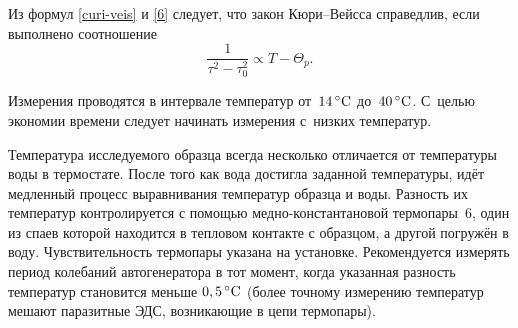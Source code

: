 Из формул \eqref{curi-veis} и \eqref{6} следует, что закон Кюри--Вейсса
справедлив, если выполнено соотношение
\begin{equation}
\frac{1}{\tau^2-\tau_0^2} \propto T-\Theta_p.
\end{equation}

Измерения проводятся в интервале температур от~$14\,^\circ\mathrm{C}$ до~$40\,^\circ\mathrm{C}$.
С~целью экономии времени следует начинать измерения с~низких температур.



Температура исследуемого образца всегда несколько отличается от температуры
воды в термостате. После того как вода достигла заданной
температуры, идёт медленный процесс выравнивания температур образца и воды.
Разность их температур контролируется с помощью медно-константановой
термопары~6, один из спаев которой находится в тепловом
контакте с образцом, а другой погружён в воду. Чувствительность термопары
указана на установке. Рекомендуется измерять период колебаний автогенератора в
тот момент, когда указанная разность температур становится меньше $0,5\,^\circ\mathrm{C}$
(более точному измерению температур мешают паразитные ЭДС, возникающие в цепи
термопары).

